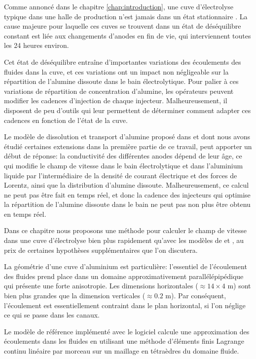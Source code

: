 Comme annoncé dans le chapitre \ref{chap:introduction}, une cuve
d'électrolyse typique dans une halle de production n'est jamais dans
un état stationnaire \cite{Steiner2009,Flotron2013}. La cause
majeure pour laquelle ces cuves se trouvent dans un état de
déséquilibre constant est liée aux changements d'anodes en fin de vie,
qui interviennent toutes les 24 heures environ.

Cet état de déséquilibre entraîne d'importantes variations des
écoulements des fluides dans la cuve, et ces variations ont un impact
non négligeable sur la répartition de l'alumine dissoute dans le bain
électrolytique. Pour palier à ces variations de répartition de
concentration d'alumine, les opérateurs peuvent modifier les cadences
d'injection de chaque injecteur. Malheureusement, il disposent de peu
d'outils qui leur permettent de déterminer comment adapter ces
cadences en fonction de l'état de la cuve.

Le modèle de dissolution et transport d'alumine proposé dans
\cite{Hofer2011} et dont nous avons étudié certaines extensions dans
la première partie de ce travail, peut apporter un début de réponse: la
conductivité des différentes anodes dépend de leur âge, ce qui modifie
le champ de vitesse dans le bain électrolytique et dans l'aluminium
liquide par l'intermédiaire de la densité de courant
électrique et des forces de Lorentz, ainsi que la distribution d'alumine
dissoute. Malheureusement, ce calcul ne peut pas être fait en temps
réel, et donc la cadence des injecteurs qui optimise la répartition de
l'alumine dissoute dans le bain ne peut pas non plus être obtenu en
temps réel.

Dans ce chapitre nous proposons une méthode pour calculer le champ de
vitesse dans une cuve d'électrolyse bien plus rapidement qu'avec les
modèles de \cite{Steiner2009} et \cite{Hofer2011}, au prix de
certaines hypothèses supplémentaires que l'on discutera.

La géométrie d'une cuve d'aluminium est particulière: l'essentiel de
l'écoulement des fluides prend place dans un domaine approximativement
parallélépipédique qui présente une forte anisotropie. Les dimensions
horizontales ($\approx \num{14}\times\num{4}$ \si{\meter}) sont bien plus
grandes que la dimension verticales ($\approx \num{0.2}$ \si{\meter}). Par
conséquent, l'écoulement est essentiellement contraint dans le plan
horizontal, si l'on néglige ce qui se passe dans les canaux.

Le modèle de référence implémenté avec le logiciel \alucell{}
\cite{Steiner2009,Flotron2013,Hofer2011,Rochat2016} calcule une
approximation des écoulements dans les fluides en utilisant une
méthode d'éléments finis Lagrange continu linéaire par morceau sur un
maillage en tétraèdres du domaine fluide.

